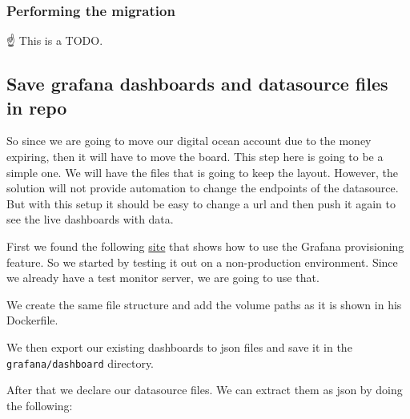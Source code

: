 \begin{Shaded}
\begin{Highlighting}[]
\end{Highlighting}
\end{Shaded}

\subsubsection{Performing the migration}
\label{log:performing-the-migration}

☝ This is a TODO.

\subsection{Save grafana dashboards and datasource files in repo}
\label{log:save-grafana-dashboards-and-datasource-files-in-repo}

So since we are going to move our digital ocean account due to the money expiring, then it will have to move the board. This step here is going to be a simple one. We will have the files that is going to keep the layout. However, the solution will not provide automation to change the endpoints of the datasource. But with this setup it should be easy to change a url and then push it again to see the live dashboards with data.

First we found the following \href{https://github.com/SebastianTorralba/Self-Provisioned-Grafana}{site} that shows how to use the Grafana provisioning feature. So we started by testing it out on a non-production environment. Since we already have a test monitor server, we are going to use that.

We create the same file structure and add the volume paths as it is shown in his Dockerfile.

We then export our existing dashboards to json files and save it in the \texttt{grafana/dashboard} directory.

After that we declare our datasource files. We can extract them as json by doing the following:

\begin{Shaded}
\begin{Highlighting}[]
 \KeywordTok{\&\&}     \KeywordTok{|}   \KeywordTok{|} \AttributeTok{{-}}
\end{Highlighting}
\end{Shaded}

